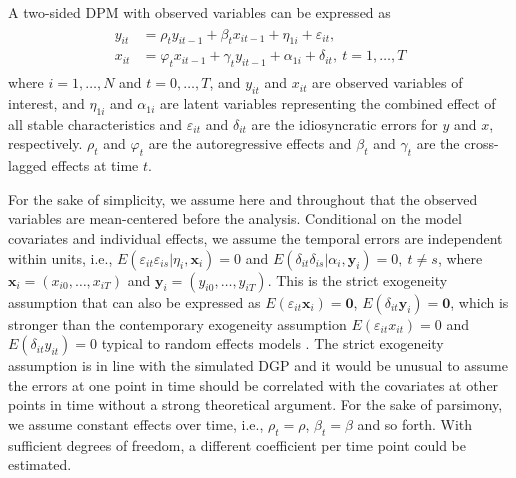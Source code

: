 \documentclass[]{interact}
\theoremstyle{plain}%
\theoremstyle{definition}
\theoremstyle{remark}
\begin{document}
A two-sided DPM with observed variables can be expressed as
\begin{align}
\begin{split}
y_{it} & = \rho_{t} y_{it-1} + \beta_{t} x_{it-1} + \eta_{1i} + \varepsilon_{it}, \\
x_{it} & = \varphi_{t} x_{it-1} + \gamma_{t} y_{it-1} + \alpha_{1i} + \delta_{it}, \ t = 1, \ldots, T \label{dpm}
\end{split}
\end{align} where \(i = 1, \ldots, N\) and \(t = 0, \ldots, T\), and
\(y_{it}\) and \(x_{it}\) are observed variables of interest, and
\(\eta_{1i}\) and \(\alpha_{1i}\) are latent variables representing the
combined effect of all stable characteristics and \(\varepsilon_{it}\)
and \(\delta_{it}\) are the idiosyncratic errors for \(y\) and \(x\),
respectively. \(\rho_{t}\) and \(\varphi_{t}\) are the autoregressive
effects and \(\beta_{t}\) and \(\gamma_{t}\) are the cross-lagged
effects at time \(t\).

For the sake of simplicity, we assume here and throughout that the
observed variables are mean-centered before the analysis. Conditional on
the model covariates and individual effects, we assume the temporal
errors are independent within units, i.e.,
\(E(\varepsilon_{it}\varepsilon_{is} | \eta_{i}, \bm{x}_{i}) = 0\) and
\(E(\delta_{it}\delta_{is} | \alpha_{i}, \bm{y}_{i})=0, \ t \ne s\),
where \(\bm{x}_{i} = (x_{i0}, \ldots, x_{iT})\) and
\(\bm{y}_{i} = (y_{i0}, \ldots, y_{iT})\). This is the strict exogeneity
assumption that can also be expressed as
\(E(\varepsilon_{it}\bm{x}_{i}) = \bm{0}\),
\(E(\delta_{it}\bm{y}_{i}) = \bm{0}\), which is stronger than the
contemporary exogeneity assumption \(E(\varepsilon_{it}x_{it}) = 0\) and
\(E(\delta_{it}y_{it}) = 0\) typical to random effects models
\citep{Bruederl2015, Wooldridge2012}. The strict exogeneity assumption
is in line with the simulated DGP and it would be unusual to assume the
errors at one point in time should be correlated with the covariates at
other points in time without a strong theoretical argument. For the sake
of parsimony, we assume constant effects over time, i.e.,
\(\rho_{t} = \rho\), \(\beta_{t} = \beta\) and so forth. With sufficient
degrees of freedom, a different coefficient per time point could be
estimated.
\end{document}
